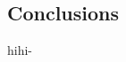 \documentclass{article}
\begin{document}
\begin{multicols}{2}
\section{Conclusions}
hihi-\cite{RTIEBT}






\end{multicols}
\end{document}
